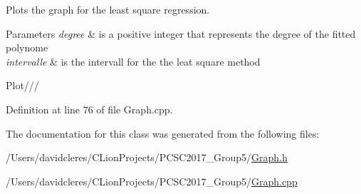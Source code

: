 Plots the graph for the least square regression. 


\begin{DoxyParams}{Parameters}
{\em degree} & is a positive integer that represents the degree of the fitted polynome \\
\hline
{\em intervalle} & is the intervall for the the leat square method \\
\hline
\end{DoxyParams}
Plot/// 

Definition at line 76 of file Graph.\+cpp.



The documentation for this class was generated from the following files\+:\begin{DoxyCompactItemize}
\item 
/\+Users/davidcleres/\+C\+Lion\+Projects/\+P\+C\+S\+C2017\+\_\+\+Group5/\mbox{\hyperlink{_graph_8h}{Graph.\+h}}\item 
/\+Users/davidcleres/\+C\+Lion\+Projects/\+P\+C\+S\+C2017\+\_\+\+Group5/\mbox{\hyperlink{_graph_8cpp}{Graph.\+cpp}}\end{DoxyCompactItemize}
